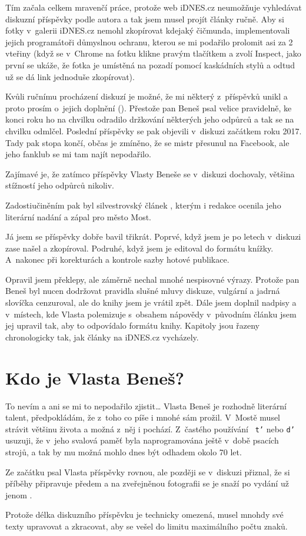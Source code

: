 Tím začala celkem mravenčí práce, protože web iDNES.cz neumožňuje vyhledávat
diskuzní příspěvky podle autora a tak jsem musel projít články ručně. Aby si
fotky v~galerii iDNES.cz nemohl zkopírovat kdejaký čičmunda, implementovali
jejich programátoři důmyslnou ochranu, kterou se mi podařilo prolomit asi za 2
vteřiny (když se v~Chrome na fotku klikne pravým tlačítkem a zvolí Inspect,
jako první se ukáže, že fotka je umístěná na pozadí pomocí kaskádních stylů a
odtud už se dá link jednoduše zkopírovat).

Kvůli ručnímu procházení diskuzí je možné, že mi některý z~příspěvků unikl a
proto prosím o~jejich doplnění ({\tt \from[mymail]}). Přestože pan Beneš psal velice pravidelně, ke
konci roku ho na chvilku odradilo držkování některých jeho odpůrců a tak se na
chvilku odmlčel. Poslední příspěvky se pak objevili v~diskuzi začátkem roku
2017. Tady pak stopa končí, občas je zmíněno, že se mistr přesunul na Facebook,
ale jeho fanklub se mi tam najít nepodařilo.

Zajímavé je, že zatímco příspěvky Vlasty Beneše se v~diskuzi dochovaly, většina
stížností jeho odpůrců nikoliv.

Zadostiučiněním pak byl silvestrovský článek {\em \from[10pohleduVlasty]},
kterým i redakce ocenila jeho literární nadání a zápal pro město Most.

Já jsem se příspěvky dobře bavil třikrát. Poprvé, když jsem je po letech
v~diskuzi zase našel a zkopíroval. Podruhé, když jsem je editoval do formátu
knížky. A~nakonec při korekturách a kontrole sazby hotové publikace.

Opravil jsem překlepy, ale záměrně nechal mnohé nespisovné výrazy. Protože pan
Beneš byl nucen dodržovat pravidla slušné mluvy diskuze, vulgární a jadrná
slovíčka cenzuroval, ale do knihy jsem je vrátil zpět. Dále jsem doplnil
nadpisy a v~místech, kde Vlasta polemizuje s~obsahem nápovědy v~původním článku
jsem jej upravil tak, aby to odpovídalo formátu knihy. Kapitoly jsou řazeny
chronologicky tak, jak články na iDNES.cz vycházely.

\section{Kdo je Vlasta Beneš?}

To nevím a ani se mi to nepodařilo zjistit\dots{} Vlasta Beneš je rozhodně
literární talent, předpokládám, že z~toho co píše i mnohé sám prožil. V~Mostě
musel strávit většinu života a možná z~něj i pochází. Z~častého používání {\tt
t'} nebo {\tt d'} usuzuji, že v~jeho svalová paměť byla naprogramována ještě
v~době psacích strojů, a tak by mu možná mohlo dnes být odhadem okolo 70 let.

Ze začátku psal Vlasta příspěvky rovnou, ale později se v~diskuzi přiznal, že
si příběhy připravuje předem a na zveřejněnou fotografii se je snaží po vydání
už jenom .

Protože délka diskuzního příspěvku je technicky omezená, musel mnohdy své texty
upravovat a zkracovat, aby se vešel do limitu maximálního počtu znaků.

\stopcolumns %
